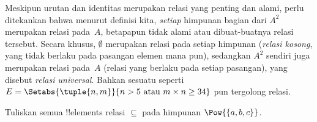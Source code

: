 \documentclass[../../../include/open-logic-section]{subfiles}
\begin{document}
\begin{explain}
Meskipun urutan dan identitas merupakan relasi yang penting dan alami, perlu
ditekankan bahwa menurut definisi kita, \emph{setiap} himpunan bagian dari
$A^{2}$ merupakan relasi pada~$A$, betapapun tidak alami atau dibuat-buatnya
relasi tersebut. Secara khusus, $\emptyset$ merupakan relasi pada setiap
himpunan (\emph{relasi kosong}, yang tidak berlaku pada pasangan elemen mana
pun), sedangkan $A^{2}$ sendiri juga merupakan relasi pada~$A$ (relasi yang
berlaku pada setiap pasangan), yang disebut \emph{relasi universal}. Bahkan
sesuatu seperti $E=\Setabs{\tuple{n, m}}{n>5 \text{ atau } m \times n \ge 34}$
pun tergolong relasi.
\end{explain}

\begin{prob}
  Tuliskan semua !!{element}s relasi $\subseteq$ pada himpunan
  $\Pow{\{a, b, c\}}$.
\end{prob}
\end{document}
